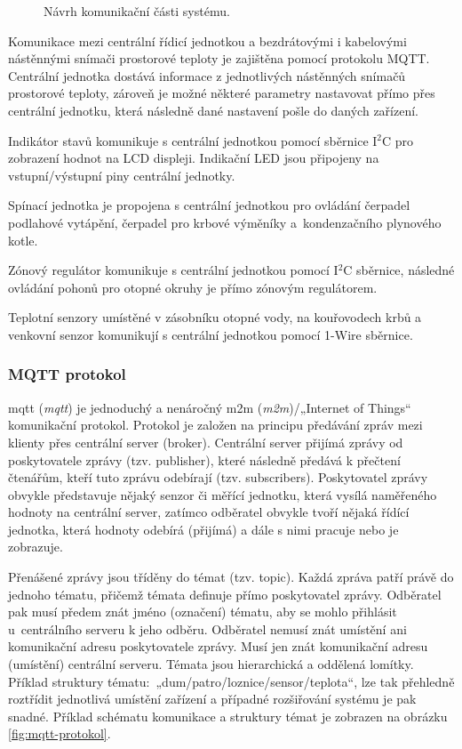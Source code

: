 \begin{figure}[H]
    \centering
    \def\svgwidth{\columnwidth}
    
    \caption{Návrh komunikační části systému.}
    \label{fig:navrh-softwarove-casti}
\end{figure}

Komunikace mezi centrální řídicí jednotkou a bezdrátovými i kabelovými nástěnnými snímači prostorové teploty je zajištěna pomocí protokolu MQTT. Centrální jednotka dostává informace z jednotlivých nástěnných snímačů prostorové teploty, zároveň je možné některé parametry nastavovat přímo přes centrální jednotku, která následně dané nastavení pošle do daných zařízení.

Indikátor stavů komunikuje s centrální jednotkou pomocí sběrnice I$^2$C pro zobrazení hodnot na LCD displeji. Indikační LED jsou připojeny  na vstupní/výstupní piny centrální jednotky.

Spínací jednotka je propojena s centrální jednotkou pro ovládání čerpadel podlahové vytápění, čerpadel pro krbové výměníky a~kondenzačního plynového kotle.

Zónový regulátor komunikuje s centrální jednotkou pomocí I$^2$C sběrnice, následné ovládání pohonů pro otopné okruhy je přímo zónovým regulátorem.

Teplotní senzory umístěné v zásobníku otopné vody, na kouřovodech krbů a venkovní senzor komunikují s centrální jednotkou pomocí 1-Wire sběrnice.



\subsubsection{MQTT protokol}
\label{sec:mqtt-protokol}

\acrshort{mqtt} (\textit{\acrlong{mqtt}}) je jednoduchý a nenáročný \acrshort{m2m} (\textit{\acrlong{m2m}})/„Internet of Things“ komunikační protokol. Protokol je založen na principu předávání zpráv mezi klienty přes centrální server (broker). Centrální server přijímá zprávy od poskytovatele zprávy (tzv. publisher), které následně předává k přečtení čtenářům, kteří tuto zprávu odebírají (tzv. subscribers). Poskytovatel zprávy obvykle představuje nějaký senzor či měřící jednotku, která vysílá naměřeného hodnoty na centrální server, zatímco odběratel obvykle tvoří nějaká řídící jednotka, která hodnoty odebírá (přijímá) a dále s nimi pracuje nebo je zobrazuje.

Přenášené zprávy jsou tříděny do témat (tzv. topic). Každá zpráva patří právě do jednoho tématu, přičemž témata definuje přímo poskytovatel zprávy. Odběratel pak musí předem znát jméno (označení) tématu, aby se mohlo přihlásit u~centrálního serveru k jeho odběru. Odběratel nemusí znát umístění ani komunikační adresu poskytovatele zprávy. Musí jen znát komunikační adresu (umístění) centrální serveru. Témata jsou hierarchická a oddělená lomítky. Příklad struktury tématu:~„dum/patro/loznice/sensor/teplota“, lze tak přehledně roztřídit jednotlivá umístění zařízení a případné rozšiřování systému je pak snadné. Příklad schématu komunikace a struktury témat je zobrazen na obrázku \ref{fig:mqtt-protokol}.
\setnowidow[2]

